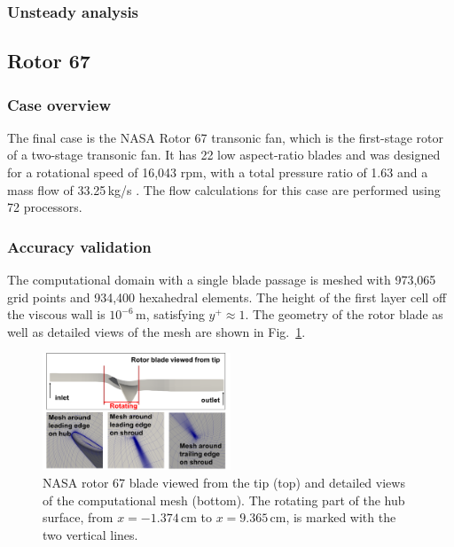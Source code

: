 \documentclass[journal,final]{new-aiaa}
\begin{document}
\subsubsection{Unsteady analysis}

\subsection {Rotor 67}
		\subsubsection{Case overview}
The final case is the NASA Rotor 67 transonic fan, which
is the first-stage rotor of a two-stage transonic fan.
It has 22 low aspect-ratio blades and was designed for
a rotational speed of 16,043 rpm, with a total pressure ratio
of 1.63 and a mass flow of 33.25\,kg/s \cite{Strazisar1989Laser}.
The flow calculations for this case are performed
using 72 processors.

\subsubsection{Accuracy validation}
The computational domain with a single blade passage is meshed
with 973,065 grid points and 934,400 hexahedral elements. The
height of the first layer cell off the viscous wall is $10^{-6}$\,m,
satisfying $y^+\!\approx\!1$. The geometry of the rotor blade as well as
detailed views of the mesh are shown in Fig.~\ref{rotor67-view}.

\begin{figure}[htb]
	\centering   
	\includegraphics[width=0.5\textwidth]{rotor67/rotor67-geo-mesh.png}
	\caption{NASA rotor 67 blade viewed from the tip (top)
		and detailed views of the computational mesh (bottom). %
		The rotating part of the hub surface, from
		$x=-1.374$\,cm to $x=9.365$\,cm, is marked with the two vertical lines.}	
	\label{rotor67-view} 
\end{figure}
\end{document}
